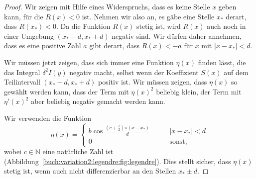 \begin{proof}

Wir zeigen mit Hilfe eines Widerspruchs, dass es keine Stelle $x$
geben kann, für die $R(x)<0$ ist.
Nehmen wir also an, es gäbe eine Stelle $x_*$ derart, dass
$R(x_*)<0$.
Da die Funktion $R(x)$ stetig ist, wird $R(x)$ auch noch in einer
Umgebung $(x_*-d,x_*+d)$ negativ sind.
Wir dürfen daher annehmen, dass es eine positive Zahl $a$ gibt
derart, dass $R(x)<-a$ für $x$ mit $|x-x_*|<d$.

Wir müssen jetzt zeigen, dass sich immer eine Funktion $\eta(x)$ finden
lässt, die das Integral $\delta^2 I(y)$ negativ macht, selbst wenn
der Koeffizient $S(x)$ auf dem Teilintervall
$(x_*-d,x_*+d)$ positiv ist.
Wir müssen zeigen, dass $\eta(x)$ so gewählt werden kann, dass der
Term mit $\eta(x)^2$ beliebig klein, der Term mit $\eta'(x)^2$ aber
beliebig negativ gemacht werden kann.

Wir verwenden die Funktion
\[
\eta(x)
=
\begin{cases}
\displaystyle
b\cos \frac{(c+\frac12)\pi (x-x_*)}{d}&\qquad |x-x_*|<d\\[3pt]
0&\qquad \text{sonst},
\end{cases}
\]
wobei $c\in\mathbb{N}$ eine natürliche Zahl ist
(Abbildung~\ref{buch:variation2:legendre:fig:legendre}).
Dies stellt sicher, dass $\eta(x)$ stetig ist,
wenn auch nicht differenzierbar an den Stellen $x_*\pm d$.


\end{proof}
